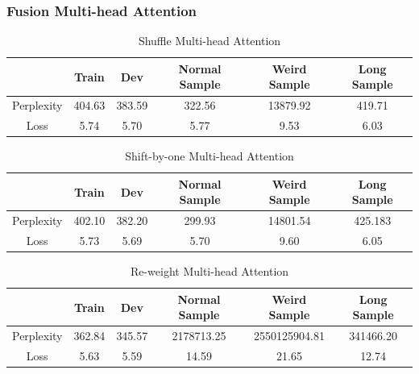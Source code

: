 \documentclass{article}
\newenvironment{solution}{\color{blue}}{}
\begin{document}
\subsubsection{Fusion Multi-head Attention}
\begin{solution}
  \begin{table}[!htbp]
    \caption{Shuffle Multi-head Attention}
    \begin{center}
      \begin{tabular}{| c | c | c | c | c | c |}
        \hline
        & Train & Dev & Normal Sample & Weird Sample & Long Sample \\ \hline
        Perplexity & 404.63 & 383.59 & 322.56 & 13879.92 & 419.71  \\ \hline
        Loss & 5.74 & 5.70 & 5.77 & 9.53 & 6.03  \\ \hline
      \end{tabular}
    \end{center}
  \end{table}

  \begin{table}[!htbp]
  \caption{Shift-by-one Multi-head Attention}
  \begin{center}
    \begin{tabular}{| c | c | c | c | c | c |}
      \hline
      & Train & Dev & Normal Sample & Weird Sample & Long Sample \\ \hline
      Perplexity & 402.10 & 382.20 & 299.93 & 14801.54 & 425.183 \\ \hline
      Loss & 5.73 & 5.69 & 5.70 & 9.60 & 6.05  \\ \hline
    \end{tabular}
  \end{center}
  \end{table}

  \begin{table}[!htbp]
  \caption{Re-weight Multi-head Attention}
  \begin{center}
    \begin{tabular}{| c | c | c | c | c | c |}
      \hline
      & Train & Dev & Normal Sample & Weird Sample & Long Sample \\ \hline
      Perplexity & 362.84 & 345.57 & 2178713.25 & 2550125904.81 & 341466.20 \\ \hline
      Loss & 5.63 & 5.59 & 14.59 & 21.65 & 12.74 \\ \hline
    \end{tabular}
  \end{center}
  \end{table}
  

\end{solution}
\end{document}
